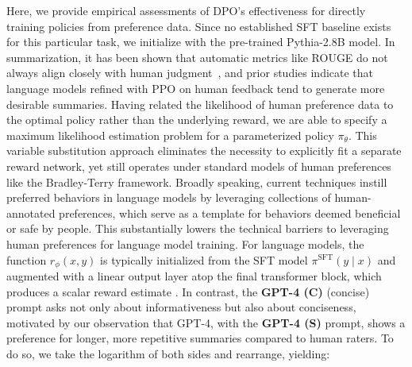 Here, we provide empirical assessments of DPO's effectiveness for directly training policies from preference data. Since no established SFT baseline exists for this particular task, we initialize with the pre-trained Pythia-2.8B model. In summarization, it has been shown that automatic metrics like ROUGE do not always align closely with human judgment~\citep{stiennon2022learning}, and prior studies indicate that language models refined with PPO on human feedback tend to generate more desirable summaries. Having related the likelihood of human preference data to the optimal policy rather than the underlying reward, we are able to specify a maximum likelihood estimation problem for a parameterized policy $\pi_\theta$. This variable substitution approach eliminates the necessity to explicitly fit a separate reward network, yet still operates under standard models of human preferences like the Bradley-Terry framework. Broadly speaking, current techniques instill preferred behaviors in language models by leveraging collections of human-annotated preferences, which serve as a template for behaviors deemed beneficial or safe by people. This substantially lowers the technical barriers to leveraging human preferences for language model training. For language models, the function $r_{\phi}(x, y)$ is typically initialized from the SFT model $\pi^\text{SFT}(y \mid x)$ and augmented with a linear output layer atop the final transformer block, which produces a scalar reward estimate \cite{ziegler2020finetuning}. In contrast, the \textbf{GPT-4 (C)} (concise) prompt asks not only about informativeness but also about conciseness, motivated by our observation that GPT-4, with the \textbf{GPT-4 (S)} prompt, shows a preference for longer, more repetitive summaries compared to human raters. To do so, we take the logarithm of both sides and rearrange, yielding:


